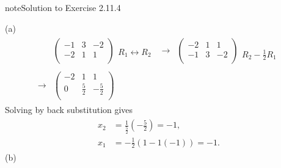 \documentclass[letterpaper,10pt,english]{jupyterBook}
\begin{document}
\begin{sphinxadmonition}{note}{Solution to Exercise 2.11.4}



\sphinxAtStartPar
(a)
\begin{equation*}
\begin{split} \begin{align*} 
    & \left( \begin{array}{cc|c} 
         -1 & 3 & -2 \\ 
         -2 & 1 & 1 \\ 
    \end{array} \right) 
    \begin{array}{l} \phantom{x} \\ R_{1} \leftrightarrow R_{2} \\ \end{array} & 
    \longrightarrow 
    & \left( \begin{array}{cc|c} 
         -2 & 1 & 1 \\ 
         -1 & 3 & -2 \\ 
    \end{array} \right) 
    \begin{array}{l} \phantom{x} \\ R_{2} - \frac{1}{2} R_{1} \end{array} \\ \\ 
    \longrightarrow 
    & \left( \begin{array}{cc|c} 
         -2 & 1 & 1 \\ 
         0 & \frac{5}{2} & - \frac{5}{2} \\ 
    \end{array} \right) 
\end{align*} \end{split}
\end{equation*}
\sphinxAtStartPar
Solving by back substitution gives
\begin{equation*}
\begin{split} \begin{align*} 
    x_{2} &=  \frac{1}{\frac{5}{2}} \left( - \frac{5}{2} \right) = -1, \\ 
    x_{1} &=  - \frac{1}{2} \left( 1 - 1 \left( -1 \right) \right) = -1. 
\end{align*} \end{split}
\end{equation*}
\sphinxAtStartPar
(b)
\begin{equation*}
\begin{split} \begin{align*} 

\end{align*}
\end{split}
\end{equation*}
\end{sphinxadmonition}
\end{document}
